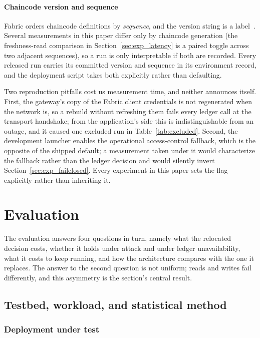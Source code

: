 \documentclass[preprint,12pt]{elsarticle}
\begin{document}
\paragraph{Chaincode version and sequence}
Fabric orders chaincode definitions by \emph{sequence}, and the version string
is a label~\cite{fabricChaincodeLifecycleDoc}. Several measurements in this paper differ only by chaincode
generation (the freshness-read comparison in
Section~\ref{sec:exp_latency} is a paired toggle across two adjacent
sequences), so a run is only interpretable if both are recorded. Every released run
carries its committed version and sequence in its environment record, and the
deployment script takes both explicitly rather than defaulting.

Two reproduction pitfalls cost us measurement time, and neither announces
itself. First, the gateway's copy of the Fabric client credentials is not
regenerated when the network is, so a rebuild without refreshing them fails
every ledger call at the transport handshake; from the application's side this
is indistinguishable from an outage, and it caused one excluded run in
Table~\ref{tab:excluded}. Second, the development launcher enables the
operational access-control fallback, which is the opposite of the shipped
default; a measurement taken under it would characterize the fallback rather
than the ledger decision and would silently invert
Section~\ref{sec:exp_failclosed}. Every experiment in this paper sets the
flag explicitly rather than inheriting it.


\section{Evaluation}
\label{sec:performance}


The evaluation answers four questions in turn, namely what the relocated
decision costs, whether it holds under attack and under ledger unavailability,
what it costs to keep running, and how the architecture compares with the one
it replaces. The answer to the second question is not uniform; reads and writes
fail differently, and this asymmetry is the section's central result.

\subsection{Testbed, workload, and statistical method}
\label{sec:testbed}

\subsubsection*{Deployment under test}
\end{document}
